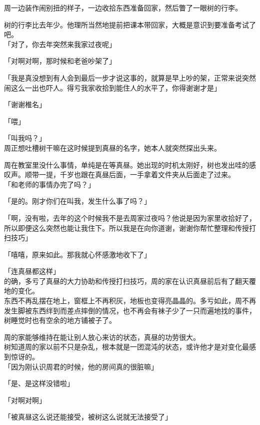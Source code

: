 周一边装作闹别扭的样子，一边收拾东西准备回家，然后瞥了一眼树的行李。

树的行李比去年少。他理所当然地提前把课本带回家，大概是意识到要准备考试了吧。\\

「对了，你去年突然来我家过夜呢」

「对啊对啊，那时候和老爸吵架了」

「我是真没想到有人会到最后一步才说这事的，就算是早上吵的架，正常来说突然闹这么一出也吓人。得亏我家收拾到能住人的水平了，你得谢谢才是」

「谢谢椎名」

「喂」

「叫我吗？」\\

周正想吐槽树干嘛在这时候提到真昼的名字，她本人就突然探出头来。

周在教室里没什么事情，单纯是在等真昼。她出现的时机太刚好，树也发出哇的感叹声。顺带一提，千岁也跟在真昼后面，一手拿着文件夹从后面走了过来。\\

「和老师的事情办完了吗？」

「是的。刚才你们在叫我，发生什么事了吗？」

「啊，没有啦，去年的这个时候我不是去周家过夜吗？他说是因为家里收拾好了，所以即便这么突然也能让我住下。所以我是在向你道谢，谢谢你帮忙整理和传授打扫技巧」

「嘻嘻，原来如此。那我就心怀感激地收下了」

「连真昼都这样」\\

的确，多亏了真昼的大力协助和传授打扫技巧，周的家在认识真昼前后有了翻天覆地的变化。\\

东西不再乱摆在地上，窗框上不再积灰，地板也变得亮晶晶的。多亏如此，周不再发生脚被东西绊到而差点摔倒的情况，也不再会有袜子少了一只而遍地找的事件，树睡觉时也有空余的地方铺被子了。

周的家能够维持在能让别人放心来访的状态，真昼的功劳很大。\\

树知道周的家以前不只是杂乱，根本就是一团混沌的状态，或许他才是对变化最感到惊讶的。\\

「因为刚认识周君的时候，他的房间真的很脏嘛」

「是、是这样没错啦」

「对啊对啊」

「被真昼这么说还能接受，被树这么说就无法接受了」

